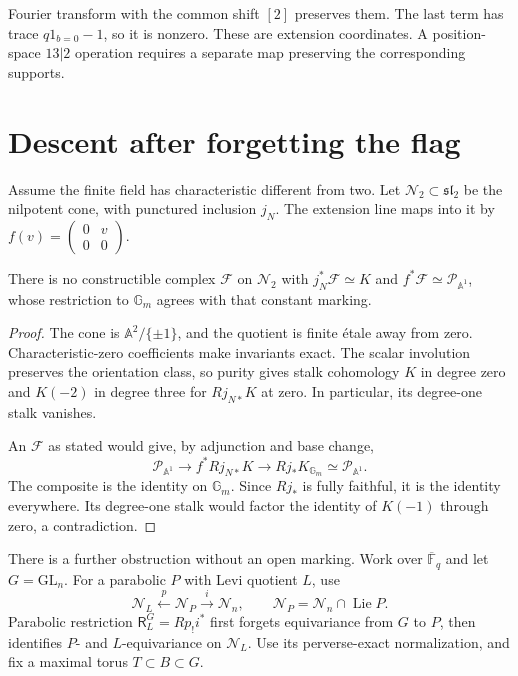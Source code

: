 Fourier transform with the common shift $[2]$ preserves them.
The last term has trace $q1_{b=0}-1$, so it is nonzero.
These are extension coordinates. A position-space $13|2$ operation
requires a separate map preserving the corresponding supports.

\section{Descent after forgetting the flag}
\label{v4-arith:hall:sec:descent}

Assume the finite field has characteristic different from two.
Let $\mathcal N_2\subset\mathfrak{sl}_2$ be the nilpotent cone,
with punctured inclusion $j_N$.
The extension line maps into it by
$f(v)=\left(\begin{smallmatrix}0&v\\0&0\end{smallmatrix}\right)$.

\begin{theorem}\label{v4-arith:hall:thm:marked-no-descent}
There is no constructible complex $\mathcal F$ on $\mathcal N_2$
with $j_N^*\mathcal F\simeq K$ and
$f^*\mathcal F\simeq\mathcal P_{\mathbb A^1}$, whose restriction
to $\mathbb G_m$ agrees with that constant marking.
\end{theorem}
\begin{proof}
The cone is $\mathbb A^2/\{\pm1\}$, and the quotient is finite
\'etale away from zero. Characteristic-zero coefficients make
invariants exact. The scalar involution preserves the orientation
class, so purity gives stalk cohomology $K$ in degree zero and
$K(-2)$ in degree three for $Rj_{N*}K$ at zero.
In particular, its degree-one stalk vanishes.

An $\mathcal F$ as stated would give, by adjunction and base change,
\[
 \mathcal P_{\mathbb A^1}\longrightarrow f^*Rj_{N*}K
       \longrightarrow Rj_*K_{\mathbb G_m}
       \simeq\mathcal P_{\mathbb A^1}.
\]
The composite is the identity on $\mathbb G_m$.
Since $Rj_*$ is fully faithful, it is the identity everywhere.
Its degree-one stalk would factor the identity of $K(-1)$ through
zero, a contradiction.
\end{proof}

There is a further obstruction without an open marking.
Work over $\overline{\mathbb F}_q$ and let $G=\mathrm{GL}_n$.
For a parabolic $P$ with Levi quotient $L$, use
\[
 \mathcal N_L\xleftarrow{p}\mathcal N_P\xrightarrow{i}\mathcal N_n,
 \qquad \mathcal N_P=\mathcal N_n\cap\operatorname{Lie}P.
\]
Parabolic restriction $\mathsf R_L^G=Rp_!i^*$ first forgets
equivariance from $G$ to $P$, then identifies $P$- and
$L$-equivariance on $\mathcal N_L$. Use its perverse-exact
normalization, and fix a maximal torus $T\subset B\subset G$.

